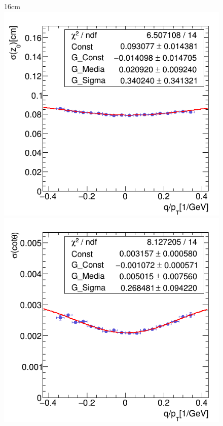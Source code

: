 \begin{figure}[htbp]{16cm}
\includegraphics[scale=0.28]{AppendixCMSL1TT/figs/r_z0_fit_single_electron_nopu}\\
\includegraphics[scale=0.28]{AppendixCMSL1TT/figs/r_cotTheta_fit_single_pion_nopu}

\end{figure}
